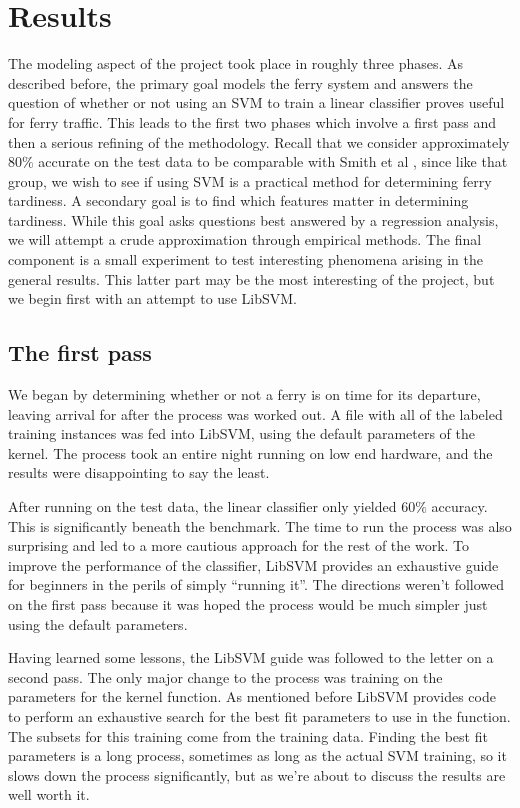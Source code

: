 \documentclass[11pt]{article} %
\begin{document}
\section{Results}
\label{sec:results}
The modeling aspect of the project took place in roughly three phases. As 
described before, the primary goal models the ferry system and answers the 
question of whether or not using an SVM to train a linear classifier proves useful 
for ferry traffic. This leads to the first two phases
which involve a first pass and then a serious refining of the methodology.  Recall 
that we consider approximately $80\%$ accurate on the test data to be comparable
with Smith et al \cite{smith2008decision}, since like that group, we wish to see
if using SVM is a practical method for determining ferry tardiness. 
A secondary goal is to find which features matter in determining tardiness.  While
this goal asks questions best answered by a regression analysis, we will 
attempt a crude approximation through empirical methods.  The final component is 
a small experiment to test interesting phenomena arising in the general results.  
This latter part may be the most interesting of the project, but we begin 
first with an attempt to use LibSVM.

\subsection{The first pass}
\label{sec:firstpass}
We began by determining whether or not a ferry is on
time for its departure, leaving arrival for after the process was worked out. 
A file with all of the labeled training instances was fed into LibSVM, using the
default parameters of the kernel. The process took an entire night running on
low end hardware, and the results were disappointing to say the least.

After running on the test data, the linear classifier only yielded $60\%$ accuracy. 
This is significantly beneath the benchmark. The time to run the process was also
surprising and led to a more cautious approach for the rest of the work. To 
improve the performance of the classifier, LibSVM provides an exhaustive guide 
\cite{chang2011libsvm} for beginners in the perils of simply ``running it''. The 
directions weren't followed on the first pass because it was hoped the process 
would be much simpler just using the default parameters. 

Having learned some lessons, the LibSVM guide was followed to the letter on a 
second pass. The only major change to the process was training on the 
parameters for the kernel function. As mentioned before LibSVM provides code
to perform an exhaustive search for the best fit parameters to use in the function.
The subsets for this training come from the training data. Finding the best fit 
parameters is a long process, sometimes as long as the actual SVM training, so it
slows down the process significantly, but as we're about to discuss the results
are well worth it.
\end{document}
